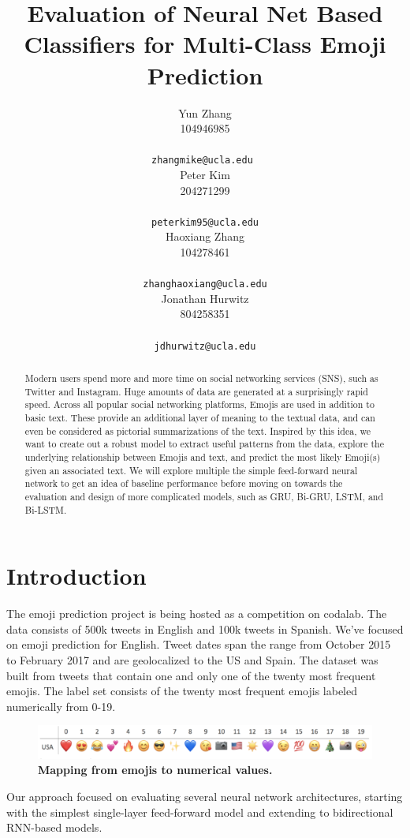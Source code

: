 \documentclass[11pt,a4paper]{article}
\title{Evaluation of Neural Net Based Classifiers for Multi-Class Emoji Prediction}
\author{Yun Zhang \\
	 104946985 \\
	 \\
	\small{\tt zhangmike@ucla.edu } \\\And
	Peter Kim \\
	204271299 \\
	 \\
	\small{\tt peterkim95@ucla.edu} \\\And
	Haoxiang Zhang \\
	104278461 \\
	 \\
	\small{\tt zhanghaoxiang@ucla.edu} \\\And
	 Jonathan Hurwitz \\
	 804258351 \\
	 \\
	\small{\tt jdhurwitz@ucla.edu} \\
}
\date{}
\begin{document}
	\maketitle
	\begin{abstract}
		Modern users spend more and more time on social networking services (SNS), such as Twitter and Instagram. Huge amounts of data are generated at a surprisingly rapid speed. Across all popular social networking platforms, Emojis are used in addition to basic text. These provide an additional layer of meaning to the textual data, and can even be considered as pictorial summarizations of the text. Inspired by this idea, we want to create out a robust model to extract useful patterns from the data, explore the underlying relationship between Emojis and text, and predict the most likely Emoji(s) given an associated text. We will explore multiple the simple feed-forward neural network to get an idea of baseline performance before moving on towards the evaluation and design of more complicated models, such as GRU, Bi-GRU, LSTM, and Bi-LSTM.
	\end{abstract}
	
	\section{Introduction}
	
	The emoji prediction project is being hosted as a competition on codalab. The data consists of 500k tweets in English and 100k tweets in Spanish. We’ve focused on emoji prediction for English. Tweet dates span the range from October 2015 to February 2017 and are geolocalized to the US and Spain. The dataset was built from tweets that contain one and only one of the twenty most frequent emojis. The label set consists of the twenty most frequent emojis labeled numerically from 0-19.
	
	\begin{figure}[H]
		\hspace*{-1.3cm}
		\centering\includegraphics[scale=0.36]{emojis} 
		\caption{\textbf{ Mapping from emojis to numerical values.}}
	\end{figure}
	
	
	Our approach focused on evaluating several neural network architectures, starting with the simplest single-layer feed-forward model and extending to bidirectional RNN-based models. 
	
\end{document}

